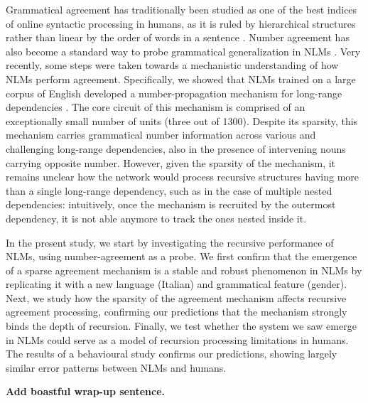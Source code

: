 Grammatical agreement has traditionally been studied as one of the
best indices of online syntactic processing in humans, as it is ruled
by hierarchical structures rather than linear by the order of words in
a sentence \citep{Bock:Miller:1991, franck2002subject}. Number
agreement has also become a standard way to probe grammatical
generalization in NLMs
\citep{Linzen:etal:2016,Bernardy:Lappin:2017,Giulianelli:etal:2018,Gulordava:etal:2018}. Very
recently, some steps were taken towards a mechanistic understanding of
how NLMs perform agreement.  Specifically, we showed that NLMs trained
on a large corpus of English developed a number-propagation mechanism
for long-range dependencies \citep{lakretz2019emergence}. The core
circuit of this mechanism is comprised of an exceptionally small
number of units (three out of 1300). Despite its sparsity, this
mechanism carries grammatical number information across various and
challenging long-range dependencies, also in the presence of
intervening nouns carrying opposite number. However, given the
sparsity of the mechanism, it remains unclear how the network would
process recursive structures having more than a single long-range
dependency, such as in the case of multiple nested dependencies:
intuitively, once the mechanism is recruited by the outermost
dependency, it is not able anymore to track the ones nested inside it.

In the present study, we start by investigating the recursive
performance of NLMs, using number-agreement as a
probe. We first confirm that the emergence of a sparse agreement mechanism is
a stable and robust phenomenon in NLMs by replicating it with a new
language (Italian) and grammatical feature (gender). Next, we study
how the sparsity of the agreement mechanism affects recursive
agreement processing, confirming our predictions that the mechanism
strongly binds the depth of recursion. Finally, we test whether the
 system we saw emerge in NLMs could serve as a
model of recursion processing limitations in humans. The results of a
behavioural study confirms our predictions, showing largely similar
error patterns between NLMs and humans.

\textbf{Add boastful wrap-up sentence.}

